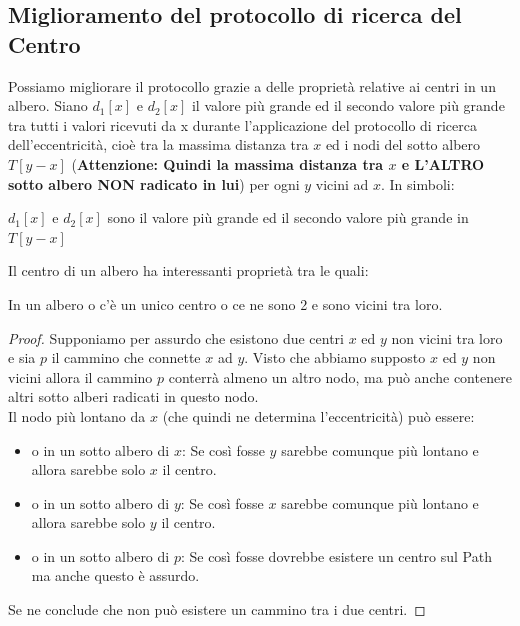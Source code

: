 \subsection{Miglioramento del protocollo di ricerca del Centro}
Possiamo migliorare il protocollo grazie a delle proprietà relative ai centri in
un albero. Siano $d_1[x]$ e $d_2[x]$ il valore più grande ed il secondo valore
più grande tra tutti i valori ricevuti da x durante l'applicazione del
protocollo di ricerca dell'eccentricità, cioè tra la massima distanza tra $x$ ed
i nodi del sotto albero $T[y-x]$ (\textbf{Attenzione: Quindi la massima distanza
    tra $x$ e L'ALTRO sotto albero NON radicato in lui}) per ogni $y$ vicini ad $x$.
In simboli:
\begin{center}
    $d_1[x]$ e $d_2[x]$ sono il valore più grande ed il secondo valore più grande
    in $T[y-x]$
\end{center}
Il centro di un albero ha interessanti proprietà tra le quali:\\

\begin{lemma}
    In un albero o c'è un unico centro o ce ne sono 2 e sono vicini
    tra loro.
\end{lemma}

\begin{proof}
    Supponiamo per assurdo che  esistono due centri $x$ ed $y$ non
    vicini tra loro e sia $p$ il cammino che connette $x$ ad $y$. Visto che abbiamo
    supposto $x$ ed $y$ non vicini allora il cammino $p$ conterrà almeno un altro
    nodo, ma può anche contenere altri sotto alberi radicati in questo nodo.\\
    Il nodo più lontano da $x$ (che quindi ne determina l'eccentricità) può essere:
    \begin{itemize}
        \item o in un sotto albero di $x$: Se così fosse $y$ sarebbe comunque più
              lontano e allora sarebbe solo $x$ il centro.
        \item o in un sotto albero di $y$: Se così fosse $x$ sarebbe comunque più
              lontano e allora sarebbe solo $y$ il centro.
        \item o in un sotto albero di $p$: Se così fosse dovrebbe esistere un centro
              sul Path ma anche questo è assurdo.
    \end{itemize}
    Se ne conclude che non può esistere un cammino tra i due centri.
\end{proof}

